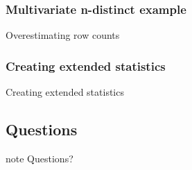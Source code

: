 \documentclass{beamer}
\begin{document}
\begin{frame}
  \frametitle{Multivariate n-distinct example}

  \begin{block}{Overestimating row counts}
    
  \end{block}
\end{frame}

\begin{frame}
  \frametitle{Creating extended statistics}

  \begin{block}{Creating extended statistics}
    
  \end{block}
\end{frame}

\subsection*{Questions}

\begin{frame}
\begin{beamercolorbox}[center]{note}
  \Huge Questions?
\end{beamercolorbox}
\end{frame}
\end{document}
